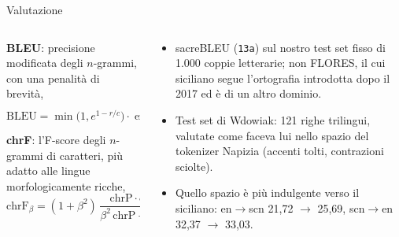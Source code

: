 \documentclass[aspectratio=169]{beamer}
\newcommand{\T}[2]{#2}
\newcommand{\T}[2]{#1}
\begin{document}
\begin{frame}{\T{Evaluation}{Valutazione}}
  \begin{columns}[t]
    \begin{column}{0.54\textwidth}
      \footnotesize
      \textbf{BLEU}: \T{modified $n$-gram precision with a brevity penalty,}%
      {precisione modificata degli $n$-grammi, con una penalit\`a di brevit\`a,}
      \[
        \mathrm{BLEU}=\min\!\big(1,e^{1-r/c}\big)\cdot
        \exp\!\Big(\textstyle\sum_{n=1}^{4} w_n\log p_n\Big).
      \]
      \textbf{chrF}: \T{the F-score of character $n$-grams, kinder to rich morphology,}%
      {l'F-score degli $n$-grammi di caratteri, pi\`u adatto alle lingue morfologicamente ricche,}
      \[
        \mathrm{chrF}_\beta=(1+\beta^2)\,\frac{\mathrm{chrP}\cdot\mathrm{chrR}}{\beta^2\,\mathrm{chrP}+\mathrm{chrR}}.
      \]
    \end{column}
    \begin{column}{0.46\textwidth}
      \footnotesize
      \begin{itemize}
        \item \T{sacreBLEU (\texttt{13a}) on our frozen test set of 1,000 literary pairs; not
              FLORES, whose Sicilian follows the post-2017 orthography and another domain.}%
              {sacreBLEU (\texttt{13a}) sul nostro test set fisso di 1.000 coppie letterarie; non FLORES, il cui siciliano segue l'ortografia introdotta dopo il 2017 ed \`e di un altro dominio.}
        \item \T{Wdowiak's test set: 121 trilingual lines, scored as he did in the space of
              the Napizia tokenizer (accents folded, contractions undone).}%
              {Test set di Wdowiak: 121 righe trilingui, valutate come faceva lui nello spazio
              del tokenizer Napizia (accenti tolti, contrazioni sciolte).}
        \item \T{That space is more lenient into Sicilian: en$\to$scn 21.72 $\to$ 25.69,
              scn$\to$en 32.37 $\to$ 33.03.}%
              {Quello spazio \`e pi\`u indulgente verso il siciliano: en$\to$scn 21,72 $\to$
              25,69, scn$\to$en 32,37 $\to$ 33,03.}
      \end{itemize}
    \end{column}
  \end{columns}
\end{frame}
\end{document}
